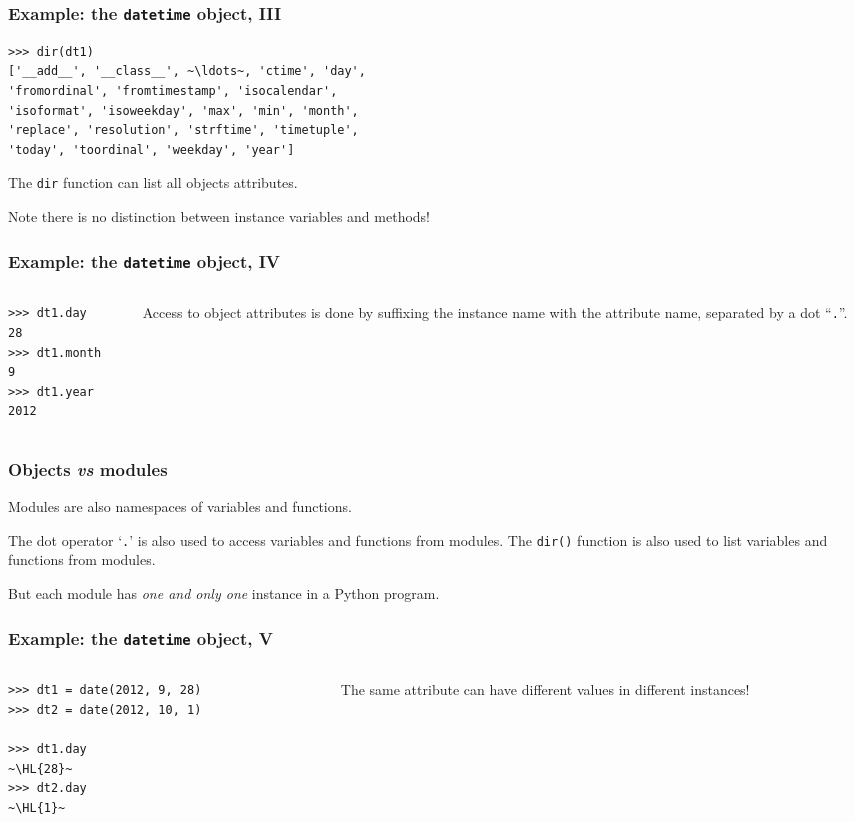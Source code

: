 \documentclass[english,serif,mathserif,xcolor=pdftex,dvipsnames,table]{beamer}
\begin{document}
\begin{frame}[fragile]
  \frametitle{Example: the \texttt{datetime} object, III}
\begin{lstlisting}
>>> dir(dt1)
['__add__', '__class__', ~\ldots~, 'ctime', 'day',
'fromordinal', 'fromtimestamp', 'isocalendar',
'isoformat', 'isoweekday', 'max', 'min', 'month',
'replace', 'resolution', 'strftime', 'timetuple',
'today', 'toordinal', 'weekday', 'year']
\end{lstlisting}

  \+
  The \texttt{dir} function can list all objects attributes.

  \+
  Note there is no distinction between instance variables and
  methods!
\end{frame}


\begin{frame}[fragile]
  \frametitle{Example: the \texttt{datetime} object, IV}
  \begin{columns}[c]
    \begin{column}{0.5\textwidth}
\begin{lstlisting}
>>> dt1.day
28
>>> dt1.month
9
>>> dt1.year
2012
\end{lstlisting}
    \end{column}
    \begin{column}{0.5\textwidth}
      \raggedleft
      Access to object attributes is done by suffixing the
      instance name with the attribute name, separated by a dot
      ``\texttt{.}''.
    \end{column}
  \end{columns}
\end{frame}


\begin{frame}
  \frametitle{Objects \emph{vs} modules}

  Modules are also namespaces of variables and functions.

  \+
  The dot operator `\texttt{.}' is also used to access variables
  and functions from modules.  The \texttt{dir()} function is also
  used to list variables and functions from modules.

  \+
  But each module has \emph{one and only one} instance in a Python
  program.
\end{frame}


\begin{frame}[fragile]
  \frametitle{Example: the \texttt{datetime} object, V}
  \begin{columns}[c]
    \begin{column}[b]{0.5\textwidth}
\begin{lstlisting}
>>> dt1 = date(2012, 9, 28)
>>> dt2 = date(2012, 10, 1)

>>> dt1.day
~\HL{28}~
>>> dt2.day
~\HL{1}~
\end{lstlisting}
    \end{column}
    \begin{column}[b]{0.5\textwidth}
      \raggedleft
      The same attribute can have different
      values in different instances!
    \end{column}
  \end{columns}
\end{frame}
\end{document}
